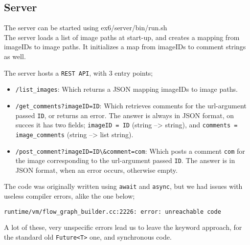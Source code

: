 \subsection*{Server}
\indent\indent The server can be started using ex6/server/bin/run.sh \\
\noindent The server loads a list of image paths at start-up, and creates a mapping from imageIDs to image paths. It initializes a map from imageIDs to comment strings as well.

The server hosts a \verb|REST API|, with 3 entry points;
\begin{itemize}
\item \verb|/list_images|: Which returns a JSON mapping imageIDs to image paths.
\item \verb|/get_comments?imageID=ID|: Which retrieves comments for the url-argument passed \verb|ID|, or returns an error.
The answer is always in JSON format, on succes it has two fields; \verb|imageID = ID| (string --> string), and \verb|comments = image_comments| (string --> list string).
\item \verb|/post_comment?imageID=ID\&comment=com|: Which posts a comment \verb|com| for the image corresponding to the url-argument passed \verb|ID|.
The answer is in JSON format, when an error occurs, otherwise empty.
\end{itemize}

The code was originally written using \verb|await| and \verb|async|, but we had issues with useless compiler errors, alike the one below;
\begin{verbatim}
runtime/vm/flow_graph_builder.cc:2226: error: unreachable code
\end{verbatim}
A lot of these, very unspecific errors lead us to leave the keyword approach, for the standard old \verb|Future<T>| one, and synchronous code.
